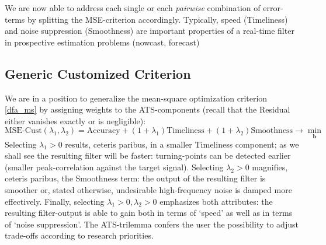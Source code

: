 \documentclass[a4paper]{book}
\begin{document}
We are now able to address each single or each \emph{pairwise} combination of error-terms by splitting the MSE-criterion accordingly. Typically, speed (Timeliness) and noise suppression (Smoothness) are important properties of a real-time filter in prospective estimation problems (nowcast, forecast)  



\subsection{Generic Customized Criterion}\label{gen_cust_crit}


We are in a position to generalize the mean-square optimization criterion \ref{dfa_ms}
by assigning weights to the ATS-components (recall that the Residual either vanishes exactly or is negligible):
\begin{equation}\label{ats_cust}
\textrm{MSE-Cust}(\lambda_1,\lambda_2)=\textrm{Accuracy}+(1+\lambda_1) \textrm{Timeliness}+(1+\lambda_2) \textrm{Smoothness}\to \min_{\mathbf{b}}
\end{equation}
Selecting $\lambda_1>0$ results, ceteris paribus, in a smaller Timeliness component; as we shall see the resulting filter will be faster: turning-points can be detected earlier (smaller peak-correlation against the target signal). Selecting
$\lambda_2>0$ magnifies, ceteris paribus, the Smoothness term: the output of the resulting filter is smoother or, stated otherwise, undesirable high-frequency noise is damped more effectively. Finally, selecting $\lambda_1>0,\lambda_2>0$ emphasizes both attributes: the resulting filter-output is able to gain both in terms of `speed' as well as in terms of `noise suppression'. The ATS-trilemma confers the user the possibility to adjust trade-offs according to research priorities.\\
\end{document}
